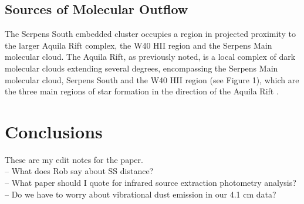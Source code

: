 \documentclass[apj]{emulateapj}
\begin{document}
\subsection{Sources of Molecular Outflow}




The Serpens South embedded cluster occupies a region in projected proximity to the larger Aquila Rift complex, the W40 HII region and the Serpens Main molecular cloud. The Aquila Rift, as previously noted, is a local complex of dark molecular clouds extending several degrees, encompassing the Serpens Main molecular cloud, Serpens South and the W40 HII region (see Figure 1), which are the three main regions of star formation in the direction of the Aquila Rift \citep{Eiroa08}. 


\section{Conclusions}



		
{}



\appendix
{\large These are my edit notes for the paper.} \\[.25in]

-- What does Rob say about SS distance?\\

-- What paper should I quote for infrared source extraction photometry analysis?\\

-- Do we have to worry about vibrational dust emission in our 4.1 cm data?\\



\end{document}
